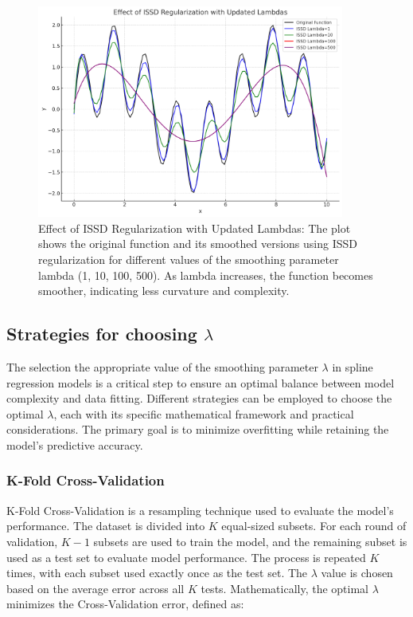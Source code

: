 \documentclass[12pt, twoside,hidelinks]{article}
\theoremstyle{definition}
\numberwithin{equation}{section}
\begin{document}
\begin{figure}[H]
\centering
\includegraphics[width=0.9\textwidth]{visuals/issd_effect.png}
\caption{Effect of ISSD Regularization with Updated Lambdas: The plot shows the original function and its smoothed versions using ISSD regularization for different values of the smoothing parameter lambda (1, 10, 100, 500). As lambda increases, the function becomes smoother, indicating less curvature and complexity.}
\label{fig:issd_effect}
\end{figure}

\subsection{Strategies for choosing \(\lambda\)}

The selection the appropriate value of the smoothing parameter \(\lambda\) in spline regression models is a critical step to ensure an optimal balance between model complexity and data fitting. Different strategies can be employed to choose the optimal \(\lambda\), each with its specific mathematical framework and practical considerations. The primary goal is to minimize overfitting while retaining the model's predictive accuracy.

\subsubsection{K-Fold Cross-Validation}
K-Fold Cross-Validation is a resampling technique used to evaluate the model's performance. The dataset is divided into \(K\) equal-sized subsets. For each round of validation, \(K-1\) subsets are used to train the model, and the remaining subset is used as a test set to evaluate model performance. The process is repeated \(K\) times, with each subset used exactly once as the test set. The \(\lambda\) value is chosen based on the average error across all \(K\) tests. Mathematically, the optimal \(\lambda\) minimizes the Cross-Validation error, defined as:
\end{document}
